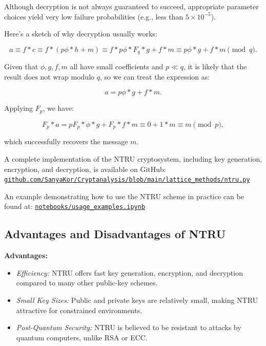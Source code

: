 \documentclass[a4paper,12pt]{article}
\begin{document}
Although decryption is not always guaranteed to succeed, appropriate parameter choices yield very low failure probabilities (e.g., less than \( 5 \times 10^{-5} \)).

Here’s a sketch of why decryption usually works:

\[
a \equiv f * c \equiv f * (p\phi * h + m) \equiv f * p\phi * F_q * g + f * m \equiv p\phi * g + f * m \pmod{q}.
\]

Given that \( \phi, g, f, m \) all have small coefficients and \( p \ll q \), it is likely that the result does not wrap modulo \( q \), so we can treat the expression as:

\[
a = p\phi * g + f * m.
\]

Applying \( F_p \), we have:

\[
F_p * a = pF_p * \phi * g + F_p * f * m \equiv 0 + 1 * m \equiv m \pmod{p},
\]

which successfully recovers the message \( m \).




\medskip

A complete implementation of the NTRU cryptosystem, including key generation, encryption, and decryption, is available on GitHub:  
\href{https://github.com/SanyaKor/Cryptanalysis/blob/main/lattice\_methods/ntru.py}{\texttt{github.com/SanyaKor/Cryptanalysis/blob/main/lattice\_methods/ntru.py}}

\smallskip

An example demonstrating how to use the NTRU scheme in practice can be found at:  
\href{https://github.com/SanyaKor/Cryptanalysis/blob/main/notebooks/usage_examples.ipynb}{\texttt{notebooks/usage\_examples.ipynb}}

\medskip

\subsection*{Advantages and Disadvantages of NTRU}

\textbf{Advantages:}
\begin{itemize}
  \item \textit{Efficiency:} NTRU offers fast key generation, encryption, and decryption compared to many other public-key schemes.
  \item \textit{Small Key Sizes:} Public and private keys are relatively small, making NTRU attractive for constrained environments.
  \item \textit{Post-Quantum Security:} NTRU is believed to be resistant to attacks by quantum computers, unlike RSA or ECC.
\end{itemize}
\end{document}
